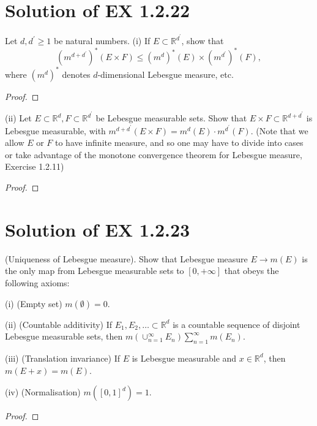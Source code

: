 \documentclass[reqno,a4paper,14pt]{amsart}
\begin{document}
\section{Solution of EX 1.2.22}
Let $d,d^\prime\geq 1$ be natural numbers. (i) If $E\subset \mathbb{R}^{d^\prime}$, show that 
\begin{equation*}
    (m^{d+d^\prime})^*(E\times F)\leq (m^d)^*(E)\times (m^{d^\prime})^*(F),
\end{equation*}
where $(m^d)^*$ denotes $d$-dimensional Lebesgue measure, etc.
\begin{proof}
    
\end{proof}
(ii) Let $E\subset \mathbb{R}^d, F\subset \mathbb{R}^{d^\prime}$ be Lebesgue measurable sets. Show that $E\times F\subset \mathbb{R}^{d+d^\prime}$ is Lebesgue measurable, with $m^{d+d^\prime}(E\times F)=m^d(E) · m^{d^\prime}(F)$. (Note that we allow $E$ or $F$ to have infinite measure, and so one may have to divide into cases or take advantage of the monotone convergence theorem for Lebesgue measure, Exercise 1.2.11)
\begin{proof}
    
\end{proof}


\section{Solution of EX 1.2.23}
(Uniqueness of Lebesgue measure). Show that Lebesgue measure $E\to m(E)$ is the only map from Lebesgue measurable sets to $[0,+\infty]$ that obeys the following axioms:

(i) (Empty set) $m(\emptyset) =0$.

(ii) (Countable additivity) If $E_1,E_2,\dots \subset \mathbb{R}^d$ is a countable sequence of disjoint Lebesgue measurable sets, then $m(\cup_{n=1}^\infty E_n)\sum_{n=1}^\infty m(E_n)$.

(iii) (Translation invariance) If $E$ is Lebesgue measurable and $x\in \mathbb{R}^d$, then $m(E+x)=m(E)$.

(iv) (Normalisation) $m([0,1]^d)=1$.
\begin{proof}
    
\end{proof}
\end{document}
